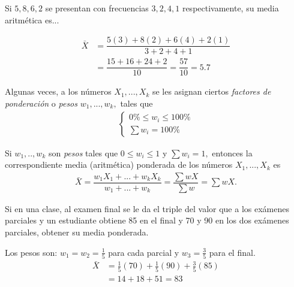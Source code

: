 \begin{ejemplo}
	Si $5,8,6,2$ se presentan con frecuencias $3,2,4,1$ respectivamente, su media aritmética es...
\end{ejemplo}

\begin{solucion}
	\begin{align}
		\bar{X} &= \dfrac{5(3) + 8(2) + 6(4) + 2(1)}{3 + 2 + 4 + 1} \\
		&= \dfrac{15 + 16 + 24 + 2}{10} = \dfrac{57}{10} = 5.7
	\end{align}
\end{solucion}


 
Algunas veces, a los números $X_{1},...,X_{k}$ se les asignan ciertos \emph{factores de ponderación} o \emph{pesos} $w_{1},...,w_{k},$ tales que \begin{align}
	\begin{cases}
		0\% \leq w_{i}\leq 100\% \\
		\sum w_{i} = 100\%
	\end{cases}
\end{align}


\begin{definicion}
	Si $w_{1},..,w_{k}$ son \emph{pesos} tales que $0\leq w_{i}\leq 1$ y $\sum w_{i}=1,$ entonces la correspondiente media (aritmética) ponderada de los números $X_{1},...,X_{k}$ es
	\begin{align}
		\bar{X}= \dfrac{w_{1}X_{1}+...+w_{k}X_{k}}{w_{1}+...+w_{k}}=\dfrac{\sum wX}{\sum w}=\sum wX.
	\end{align}
\end{definicion}



\begin{ejemplo}
	Si en una clase, al examen final se le da el triple del valor que a los exámenes parciales y un estudiante obtiene 85 en el final y 70 y 90 en los dos exámenes parciales, obtener su media ponderada.
\end{ejemplo}

\begin{solucion}
	Los pesos son: $w_1 = w_2 = \frac{1}{5}$ para cada parcial y $w_3 = \frac{3}{5}$ para el final.
	\begin{align}
		\bar{X} &= \frac{1}{5}(70) + \frac{1}{5}(90) + \frac{3}{5}(85) \\
		&= 14 + 18 + 51 = 83
	\end{align}
\end{solucion}




